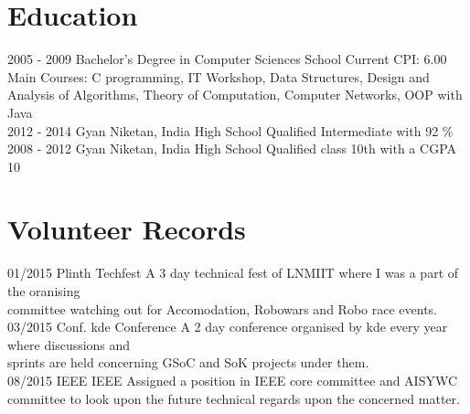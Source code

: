 \documentclass[]{friggeri-cv}
\begin{document}
\section{Education}
\begin{entrylist}
  \entry
    {2005 - 2009}
    {Bachelor's Degree in Computer Sciences}
    {School}
    {Current CPI: 6.00 \\Main Courses: C programming, IT Workshop, Data Structures, Design and Analysis of Algorithms, Theory of Computation, Computer Networks, OOP with Java\\}
  \entry
    {2012 - 2014}
    {Gyan Niketan, India}
    {High School}
    {Qualified Intermediate with 92 \% \\}
  \entry
    {2008 - 2012}
    {Gyan Niketan, India}
    {High School}
    {Qualified class 10th with a CGPA 10}
\end{entrylist}


\section{Volunteer Records}
\begin{entrylist}
  \entry
    {01/2015}
    {Plinth}
    {Techfest}
    {A 3 day technical fest of LNMIIT where I was a part of the oranising \\committee watching out for Accomodation, Robowars and Robo race events.\\}
  \entry
    {03/2015}
    {Conf. kde}
    {Conference}
    {A 2 day conference organised by kde every year where discussions and \\sprints are held concerning GSoC and SoK projects under them.\\}
  \entry
    {08/2015}
    {IEEE}
    {IEEE}
    {Assigned a position in IEEE core committee and AISYWC committee to look upon the future technical regards upon the concerned matter.}
\end{entrylist}
\end{document}
